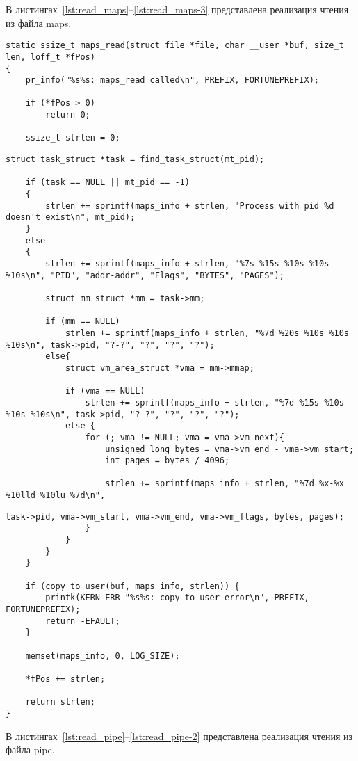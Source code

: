 В листингах~\ref{lst:read_maps}--\ref{lst:read_maps-3} представлена реализация чтения из файла maps.

\begin{lstlisting}[label=lst:read_maps, caption=Реализация функции чтения из файла maps]			
static ssize_t maps_read(struct file *file, char __user *buf, size_t len, loff_t *fPos)
{
	pr_info("%s%s: maps_read called\n", PREFIX, FORTUNEPREFIX);
	
	if (*fPos > 0)
		return 0;
	
	ssize_t strlen = 0;
\end{lstlisting}	
\begin{lstlisting}[label=lst:read_maps-2, caption=Реализация функции чтения из файла maps]		
	struct task_struct *task = find_task_struct(mt_pid);
	
	if (task == NULL || mt_pid == -1)
	{
		strlen += sprintf(maps_info + strlen, "Process with pid %d doesn't exist\n", mt_pid);
	}
	else
	{
		strlen += sprintf(maps_info + strlen, "%7s %15s %10s %10s %10s\n", "PID", "addr-addr", "Flags", "BYTES", "PAGES");
		
		struct mm_struct *mm = task->mm;
		
		if (mm == NULL)
			strlen += sprintf(maps_info + strlen, "%7d %20s %10s %10s %10s\n", task->pid, "?-?", "?", "?", "?");
		else{
			struct vm_area_struct *vma = mm->mmap;
			
			if (vma == NULL)
				strlen += sprintf(maps_info + strlen, "%7d %15s %10s %10s %10s\n", task->pid, "?-?", "?", "?", "?");
			else {
				for (; vma != NULL; vma = vma->vm_next){
					unsigned long bytes = vma->vm_end - vma->vm_start;
					int pages = bytes / 4096;
					
					strlen += sprintf(maps_info + strlen, "%7d %x-%x %10lld %10lu %7d\n", 
\end{lstlisting}	
\begin{lstlisting}[label=lst:read_maps-3, caption=Реализация функции чтения из файла maps]					
					task->pid, vma->vm_start, vma->vm_end, vma->vm_flags, bytes, pages);
				}
			}
		}
	}
	
	if (copy_to_user(buf, maps_info, strlen)) {
		printk(KERN_ERR "%s%s: copy_to_user error\n", PREFIX, FORTUNEPREFIX);
		return -EFAULT;
	}
	
	memset(maps_info, 0, LOG_SIZE);
	
	*fPos += strlen;
	
	return strlen;
}
\end{lstlisting}

В листингах~\ref{lst:read_pipe}--\ref{lst:read_pipe-2} представлена реализация чтения из файла pipe.

